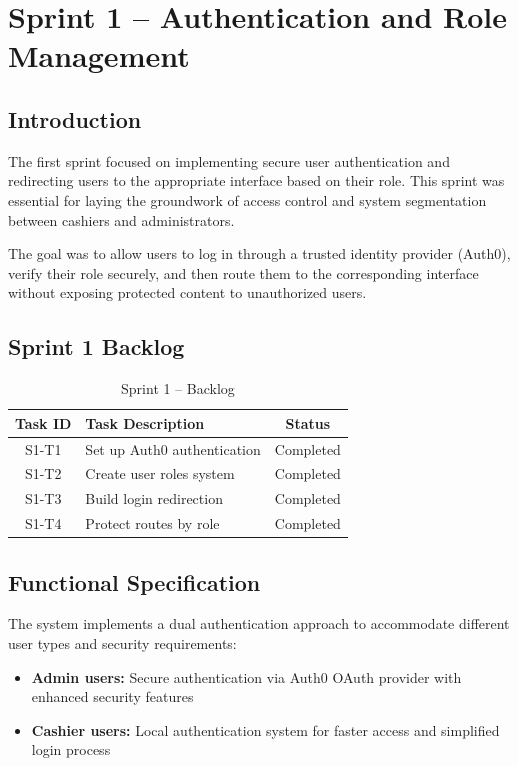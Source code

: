\chapter{Sprint 1 – Authentication and Role Management}

\section{Introduction}

The first sprint focused on implementing secure user authentication and redirecting users to the appropriate interface based on their role. This sprint was essential for laying the groundwork of access control and system segmentation between cashiers and administrators.

The goal was to allow users to log in through a trusted identity provider (Auth0), verify their role securely, and then route them to the corresponding interface without exposing protected content to unauthorized users.

\section{Sprint 1 Backlog}

\begin{table}[H]
\centering
\begin{tabular}{|c|p{10cm}|c|}
\hline
\textbf{Task ID} & \textbf{Task Description} & \textbf{Status} \\
\hline
S1-T1 & Set up Auth0 authentication & Completed \\
S1-T2 & Create user roles system & Completed \\
S1-T3 & Build login redirection & Completed \\
S1-T4 & Protect routes by role & Completed \\
\hline
\end{tabular}
\caption{Sprint 1 – Backlog}
\label{tab:sprint1-backlog}
\end{table}

\section{Functional Specification}

The system implements a dual authentication approach to accommodate different user types and security requirements:

\begin{itemize}
  \item \textbf{Admin users:} Secure authentication via Auth0 OAuth provider with enhanced security features
  \item \textbf{Cashier users:} Local authentication system for faster access and simplified login process
\end{itemize}

